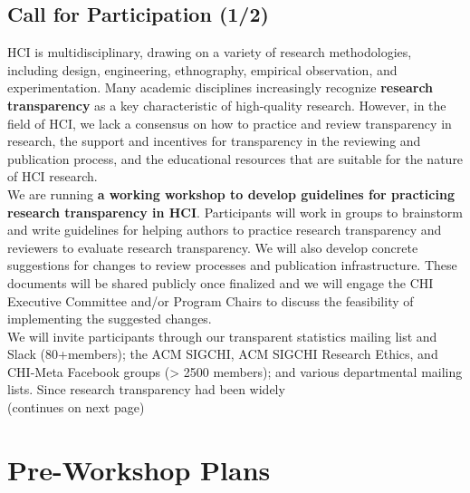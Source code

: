 \documentclass[sigchi-a, authorversion]{acmart}
\begin{document}
\begin{sidebar}
\vspace{-1.8cm}


\section{Call for Participation (1/2)}
HCI is multidisciplinary, drawing on a variety of research methodologies, including design, engineering, ethnography, empirical observation, and experimentation. Many academic disciplines increasingly recognize \textbf{research transparency} as a key characteristic of high-quality research. However, in the field of HCI, we lack a consensus on how to practice and review transparency in research, the support and incentives for transparency in the reviewing and publication process, and the educational resources that are suitable for the nature of HCI research. \\

We are running \textbf{a working workshop to develop guidelines for practicing research transparency in HCI}. Participants will work in groups to brainstorm and write guidelines for helping authors to practice research transparency and reviewers to evaluate research transparency. We will also develop concrete suggestions for changes to review processes and publication infrastructure. These documents will be shared publicly once finalized and we will engage the CHI Executive Committee and/or Program Chairs to discuss the feasibility of implementing the suggested changes. \\

We will invite participants through our transparent statistics mailing list and Slack (80+members); the ACM SIGCHI, ACM SIGCHI Research Ethics, and CHI-Meta Facebook groups (> 2500 members); and various departmental mailing lists. Since research transparency had been widely \\

(continues on next page)
\end{sidebar}






\section{Pre-Workshop Plans}
\end{document}
